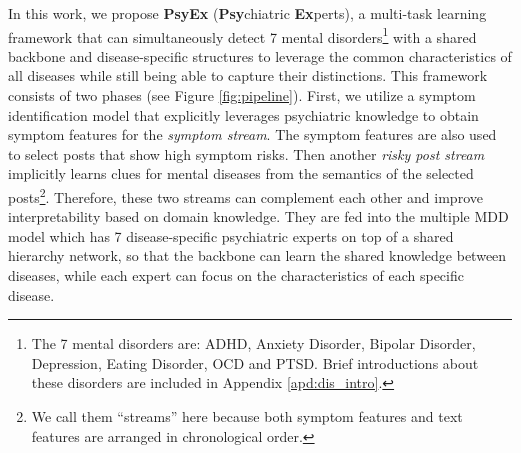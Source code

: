 In this work, we propose \textbf{PsyEx} (\textbf{Psy}chiatric \textbf{Ex}perts), a multi-task learning framework that can simultaneously detect 7 mental disorders\footnote{The 7 mental disorders are: ADHD, Anxiety Disorder, Bipolar Disorder, Depression, Eating Disorder, OCD and PTSD. Brief introductions about these disorders are included in Appendix \ref{apd:dis_intro}.} with a shared backbone and disease-specific structures to leverage the common characteristics of all diseases while still being able to capture their distinctions. This framework consists of two phases (see Figure \ref{fig:pipeline}). First, we utilize a symptom identification model that explicitly leverages psychiatric knowledge to obtain symptom features for the \textit{symptom stream}. The symptom features are also used to select posts that show high symptom risks. Then another \textit{risky post stream} implicitly learns clues for mental diseases from the semantics of the selected posts\footnote{We call them ``streams'' here because both symptom features and text features are arranged in chronological order.}. Therefore, these two streams can complement each other and improve interpretability based on domain knowledge. 
They are fed into the multiple MDD model which has 7 disease-specific psychiatric experts on top of a shared hierarchy network, so that the backbone can learn the shared knowledge between diseases, while each expert can focus on the characteristics of each specific disease. 

